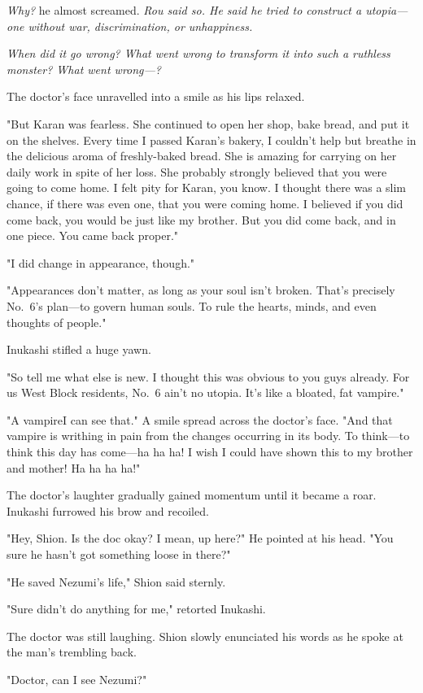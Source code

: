 \emph{Why?} he almost screamed. \emph{Rou said so. He said he tried to construct a
utopia---one without war, discrimination, or unhappiness.}

\emph{When did it go wrong? What went wrong to transform it into such a
ruthless monster? What went wrong---?}

The doctor's face unravelled into a smile as his lips relaxed.

"But Karan was fearless. She continued to open her shop, bake bread, and
put it on the shelves. Every time I passed Karan's bakery, I couldn't
help but breathe in the delicious aroma of freshly-baked bread. She is
amazing for carrying on her daily work in spite of her loss. She
probably strongly believed that you were going to come home. I felt pity
for Karan, you know. I thought there was a slim chance, if there was
even one, that you were coming home. I believed if you did come back,
you would be just like my brother. But you did come back, and in one
piece. You came back proper."

"I did change in appearance, though."

"Appearances don't matter, as long as your soul isn't broken. That's
precisely No.~6's plan---to govern human souls. To rule the hearts, minds,
and even thoughts of people."

Inukashi stifled a huge yawn.

"So tell me what else is new. I thought this was obvious to you guys
already. For us West Block residents, No.~6 ain't no utopia. It's like a
bloated, fat vampire."

"A vampire\el I can see that." A smile spread across the doctor's face.
"And that vampire is writhing in pain from the changes occurring in its
body. To think---to think this day has come---ha ha ha! I wish I could have
shown this to my brother and mother! Ha ha ha ha!"

The doctor's laughter gradually gained momentum until it became a roar.
Inukashi furrowed his brow and recoiled.

"Hey, Shion. Is the doc okay? I mean, up here?" He pointed at his head.
"You sure he hasn't got something loose in there?"

"He saved Nezumi's life," Shion said sternly.

"Sure didn't do anything for me," retorted Inukashi.

The doctor was still laughing. Shion slowly enunciated his words as he
spoke at the man's trembling back.

"Doctor, can I see Nezumi?"

